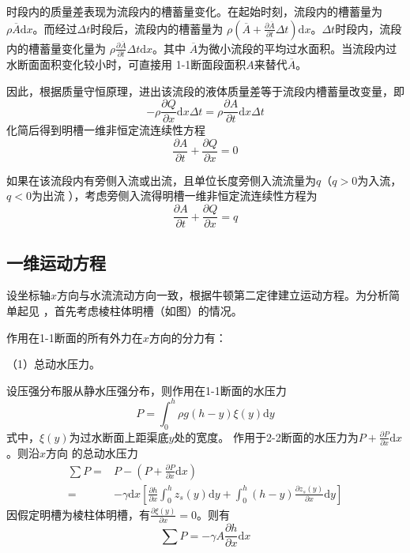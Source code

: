 时段内的质量差表现为流段内的槽蓄量变化。在起始时刻，流段内的槽蓄量为
$\rho\overline{A}\mathrm{d}x$。而经过$\Delta t$时段后，流段内的槽蓄量为
$\rho\left(\overline{A}+\frac{\partial\overline{A}}{\partial t}\Delta
t\right)\mathrm{d}x$。$\Delta t$时段内，流段内的槽蓄量变化量为
$\rho\frac{\partial \overline{A}}{\partial t}\Delta t\mathrm{d}x$。其中
$\overline{A}$为微小流段的平均过水面积。当流段内过水断面面积变化较小时，可直接用
1-1断面段面积$A$来替代$\overline{A}$。

因此，根据质量守恒原理，进出该流段的液体质量差等于流段内槽蓄量改变量，即
\begin{equation*}
  -\rho\frac{\partial Q}{\partial x}\mathrm{d}x\Delta t
  =
  \rho\frac{\partial A}{\partial t}\mathrm{d}x\Delta t
\end{equation*}
化简后得到明槽一维非恒定流连续性方程
\begin{equation}
  \frac{\partial A}{\partial t}
  +
  \frac{\partial Q}{\partial x}
  =
  0
  \label{EqCGe_SVe_Ce}
\end{equation}

如果在该流段内有旁侧入流或出流，且单位长度旁侧入流流量为$q$（$q>0$为入流，$q<0$为出流
），考虑旁侧入流得明槽一维非恒定流连续性方程为
\begin{equation}
\frac{\partial A}{\partial t}
+
\frac{\partial Q}{\partial x}
=
q
\end{equation}

\subsection{一维运动方程}
设坐标轴$x$方向与水流流动方向一致，根据牛顿第二定律建立运动方程。为分析简单起见
，首先考虑棱柱体明槽（如图）的情况。

作用在1-1断面的所有外力在$x$方向的分力有：

（1）总动水压力。

设压强分布服从静水压强分布，则作用在1-1断面的水压力
\begin{equation}
P
=
\int_{0}^{h}\! \rho g(h-y)\xi(y)\mathrm{d}y
\end{equation}
式中，$\xi(y)$为过水断面上距渠底$y$处的宽度。
作用于2-2断面的水压力为$P+\frac{\partial P}{\partial x}\mathrm{d}x$。则沿$x$方向
的总动水压力
\begin{equation}
  \begin{aligned}
    \sum P
    =&
    P - \left(P+\frac {\partial P} {\partial x}\mathrm{d}x\right)
    \\
    =&
    -\gamma \mathrm{d}x 
    \left[
      \frac{\partial h}{\partial x}
      \int_{0}^{h}\!
       z_{s}(y)
      \mathrm{d}y
      +
      \int_{0}^{h}\!
      (h-y)
      \frac{\partial  z_{s}(y)}{\partial x}
      \mathrm{d}y
    \right]
  \end{aligned}
  \label{EqCGe_SVe_Me_Pressure}
\end{equation}
因假定明槽为棱柱体明槽，有$\frac{\partial \xi(y)}{\partial x}=0$。则有
\begin{equation}
\sum P
=
-\gamma A\frac{\partial h}{\partial x}\mathrm{d}x
\end{equation}

